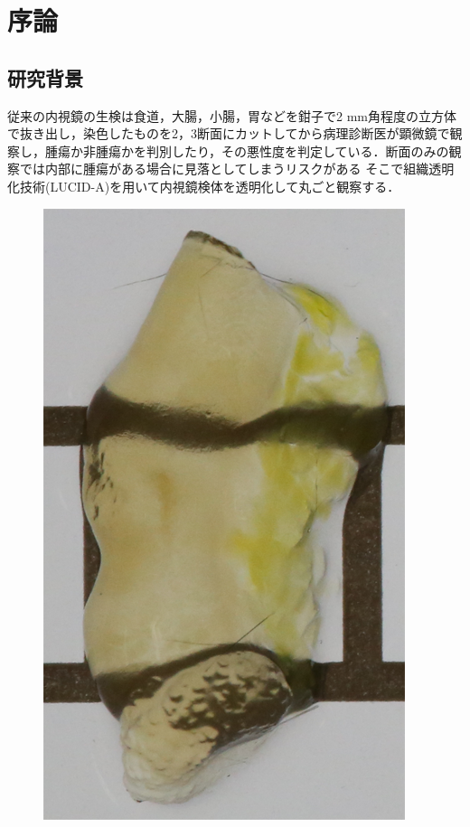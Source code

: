 \chapter{序論}
\label{chap_intro}

\section{研究背景}
従来の内視鏡の生検は食道，大腸，小腸，胃などを鉗子で2 mm角程度の立方体で抜き出し，染色したものを2，3断面にカットしてから病理診断医が顕微鏡で観察し，腫瘍か非腫瘍かを判別したり，その悪性度を判定している．断面のみの観察では内部に腫瘍がある場合に見落としてしまうリスクがある
そこで組織透明化技術(LUCID-A)\cite{sekitani2016ultraflexible}を用いて内視鏡検体を透明化して丸ごと観察する．

\begin{figure}[H]
	\centering
	\begin{minipage}{0.4\columnwidth}
		\centering
		\includegraphics[clip, width=\linewidth]{fig/chapter1/colon_lucid}

\end{minipage}
\end{figure}
